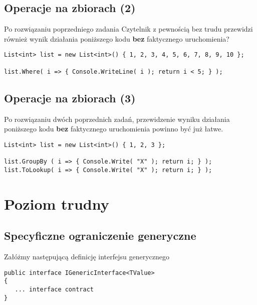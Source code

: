 \subsection{Operacje na zbiorach (2)}

Po rozwiązaniu poprzedniego zadania Czytelnik z pewnością bez trudu przewidzi również wynik działania poniższego kodu {\bf bez} faktycznego uruchomienia?

\begin{scriptsize}
\begin{verbatim}
List<int> list = new List<int>() { 1, 2, 3, 4, 5, 6, 7, 8, 9, 10 };
 
list.Where( i => { Console.WriteLine( i ); return i < 5; } );
\end{verbatim}
\end{scriptsize}

\subsection{Operacje na zbiorach (3)}

Po rozwiązaniu dwóch poprzednich zadań, przewidzenie wyniku działania poniższego kodu {\bf bez} faktycznego uruchomienia powinno być już łatwe.

\begin{scriptsize}
\begin{verbatim}
List<int> list = new List<int>() { 1, 2, 3 };
 
list.GroupBy ( i => { Console.Write( "X" ); return i; } );
list.ToLookup( i => { Console.Write( "X" ); return i; } );
\end{verbatim}
\end{scriptsize}

\section{Poziom trudny}

\subsection{Specyficzne ograniczenie generyczne}

Załóżmy następującą definicję interfejsu generycznego

\begin{scriptsize}
\begin{verbatim}
public interface IGenericInterface<TValue>
{
   ... interface contract
}
\end{verbatim}
\end{scriptsize}

